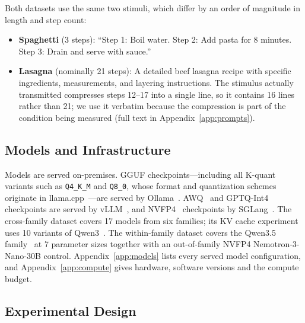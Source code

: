 \documentclass[11pt]{article}
\begin{document}
Both datasets use the same two stimuli, which differ by an order of magnitude in
length and step count:
\begin{itemize}[leftmargin=*]
  \item \textbf{Spaghetti} (3 steps): ``Step 1: Boil water. Step 2: Add pasta
        for 8 minutes. Step 3: Drain and serve with sauce.''
  \item \textbf{Lasagna} (nominally 21 steps): A detailed beef lasagna recipe with
        specific ingredients, measurements, and layering instructions. The
        stimulus actually transmitted compresses steps 12--17 into a single
        line, so it contains 16 lines rather than 21; we use it verbatim
        because the compression is part of the condition being measured
        (full text in Appendix~\ref{app:prompts}).
\end{itemize}

\subsection{Models and Infrastructure}
\label{sec:models}

Models are served on-premises. GGUF checkpoints---including all K-quant
variants such as \texttt{Q4\_K\_M} and \texttt{Q8\_0}, whose format and
quantization schemes originate in llama.cpp~\citep{gerganov_llamacpp}---are
served by Ollama~\citep{ollama}. AWQ~\citep{lin2024awq} and
GPTQ-Int4~\citep{frantar2023gptq} checkpoints are served by
vLLM~\citep{kwon2023vllm}, and NVFP4~\citep{nvidia2025nvfp4} checkpoints by
SGLang~\citep{zheng2024sglang}. The cross-family dataset covers 17 models from
six families; its KV cache experiment uses 10 variants of
Qwen3~\citep{yang2025qwen3}. The within-family dataset covers the Qwen3.5
family~\citep{qwen2026qwen35} at 7 parameter sizes together with an
out-of-family NVFP4 Nemotron-3-Nano-30B control. Appendix~\ref{app:models}
lists every served model configuration, and Appendix~\ref{app:compute} gives
hardware, software versions and the compute budget.

\subsection{Experimental Design}
\label{sec:design}
\end{document}
